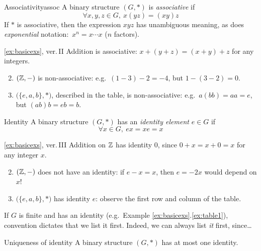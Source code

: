 \begin{defn}{Associativity}{assoc}
	A binary structure $(G,\ast)$ is \emph{associative} if
	\[
		\forall x,y,z\in G,\ x(yz)=(xy)z
	\]
	If $\ast$ is associative, then the expression $x y z$ has unambiguous meaning, as does  \emph{exponential} notation:\ $x^n=x\cdots x$ ($n$ factors).
\end{defn}

\begin{examples*}{\ref{ex:basicexs}, ver.\,II}{}
	\exstart Addition is associative: $x+(y+z)=(x+y)+z$ for any integers.\vspace{-2pt}
	\begin{enumerate}\setcounter{enumi}{1}%
	  \item $(\mathbb{Z},-)$ is non-associative: e.g.\ $(1-3)-2=-4$, but $1-(3-2)=0$.
	  \item $\bigl(\{e,a,b\},*\bigr)$, described in the table, is non-associative: e.g.\ $a(bb)=aa=e$, but $(ab)b=eb=b$.
	\end{enumerate}
\end{examples*}

\goodbreak

\begin{defn}{Identity}{}
	A binary structure $(G,\ast)$ has an \emph{identity element} $e\in G$ if
	\[
		\forall x\in G,\ ex=xe=x
	\]
\end{defn}

\begin{examples*}{\ref{ex:basicexs}, ver.\,III}{}
	\exstart Addition on $\mathbb{Z}$ has identity 0, since $0+x=x+0=x$ for any integer $x$.
	\begin{enumerate}\setcounter{enumi}{1}%
	  \item $(\mathbb{Z},-)$ does not have an identity: if $e-x=x$, then $e=-2x$ would depend on $x$!
	  \item $\bigl(\{e,a,b\},*\bigr)$ has identity $e$: observe the first row and column of the table.
	\end{enumerate}
\end{examples*}

If $G$ is finite and has an identity (e.g.\ Example \ref*{ex:basicexs}.\ref{ex:table1}), convention dictates that we list it first. Indeed, we can always list \emph{it} first, since\ldots

\begin{lemm}{Uniqueness of identity}{}
	A binary structure $(G,\ast)$ has at most one identity.
\end{lemm}

